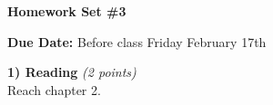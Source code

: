 

\def\xyprime{\ensuremath{\begin{pmatrix} x' \\ y' \end{pmatrix}}}



\thispagestyle{fancy}






\begin{center}
{\huge \textbf{Homework Set \#3}}
\large

{\textbf{ Due Date:} Before class Friday February 17th  }
\end{center}

\textbf{1) Reading } \hfill \textit{(2 points)}\\
Reach chapter 2.

\vspace*{0.25in}


